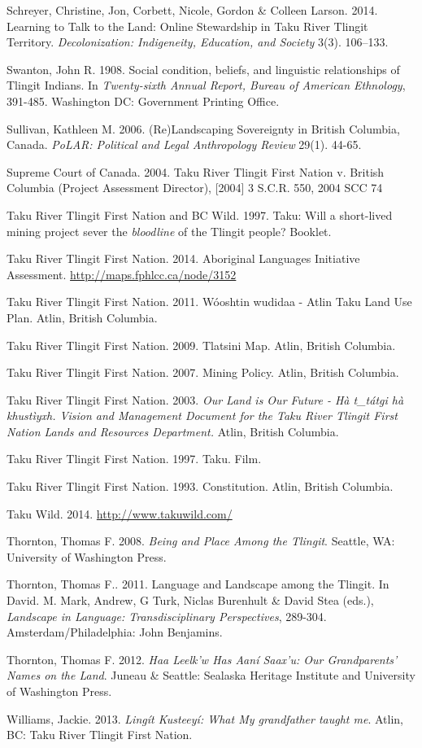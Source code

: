\begin{hang}
Schreyer, Christine, Jon, Corbett, Nicole, Gordon \& Colleen Larson. 2014. Learning to Talk to the Land: Online Stewardship in Taku River Tlingit Territory. \textit{Decolonization: Indigeneity, Education, and Society } 3(3). 106--133.

Swanton, John R. 1908. Social condition, beliefs, and linguistic relationships of Tlingit Indians. In \textit{Twenty-sixth Annual Report, Bureau of American Ethnology}, 391-485. Washington DC:  Government Printing Office.

Sullivan, Kathleen M. 2006. (Re)Landscaping Sovereignty in British Columbia, Canada. \textit{PoLAR: Political and Legal Anthropology Review}  29(1). 44-65.

Supreme Court of Canada. 2004. Taku River Tlingit First Nation v. British Columbia (Project Assessment Director), [2004] 3 S.C.R. 550, 2004 SCC 74

Taku River Tlingit First Nation and BC Wild. 1997. Taku: Will a short-lived mining project sever the \textit{bloodline }of the Tlingit people? Booklet.

Taku River Tlingit First Nation. 2014. Aboriginal Languages Initiative Assessment. \url{http://maps.fphlcc.ca/node/3152}

Taku River Tlingit First Nation. 2011. Wóoshtin wudidaa - Atlin Taku Land Use Plan. Atlin, British Columbia.

Taku River Tlingit First Nation. 2009. Tlatsini Map. Atlin, British Columbia.

Taku River Tlingit First Nation. 2007. Mining Policy. Atlin, British Columbia.

Taku River Tlingit First Nation. 2003. \textit{Our Land is Our Future - Hà t\_tátgi hà khustìyxh. Vision and Management Document for the Taku River Tlingit First Nation Lands and Resources Department.} Atlin, British Columbia.

Taku River Tlingit First Nation. 1997. Taku. Film.

Taku River Tlingit First Nation. 1993. Constitution. Atlin, British Columbia.

Taku Wild. 2014. \url{http://www.takuwild.com/}

Thornton, Thomas F. 2008. \textit{Being and Place Among the Tlingit}. Seattle, WA: University of Washington Press.

Thornton, Thomas F.. 2011. Language and Landscape among the Tlingit. In David. M. Mark, Andrew, G Turk, Niclas Burenhult \& David Stea (eds.), \textit{Landscape in Language: Transdisciplinary Perspectives},  289-304. Amsterdam/Philadelphia: John Benjamins.


Thornton, Thomas F.  2012. \textit{Haa Leelk’w Has Aaní Saax’u: Our Grandparents’ Names on the Land}. Juneau \&  Seattle: Sealaska Heritage Institute and University of Washington Press.

Williams, Jackie. 2013. \textit{Lingít Kusteeyí: What My grandfather taught me}. Atlin, BC: Taku River Tlingit First  Nation.


\end{hang}

